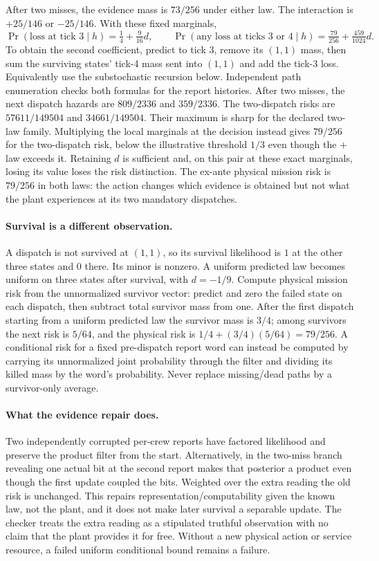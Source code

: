 \documentclass[11pt]{article}
\begin{document}
After two misses, the evidence mass is $73/256$ under either law. The interaction is $+25/146$ or $-25/146$. With these fixed marginals,
\[
\Pr(\text{loss at tick 3}\mid h)=\tfrac14+\tfrac9{16}d,\qquad
\Pr(\text{any loss at ticks 3 or 4}\mid h)=\tfrac{79}{256}+\tfrac{459}{1024}d .
\]
To obtain the second coefficient, predict to tick 3, remove its $(1,1)$ mass, then sum the surviving states' tick-4 mass sent into $(1,1)$ and add the tick-3 loss. Equivalently use the substochastic recursion below. Independent path enumeration checks both formulas for the report histories. After two misses, the next dispatch hazards are $809/2336$ and $359/2336$. The two-dispatch risks are $57611/149504$ and $34661/149504$. Their maximum is sharp for the declared two-law family. Multiplying the local marginals at the decision instead gives $79/256$ for the two-dispatch risk, below the illustrative threshold $1/3$ even though the $+$ law exceeds it. Retaining $d$ is sufficient and, on this pair at these exact marginals, losing its value loses the risk distinction. The ex-ante physical mission risk is $79/256$ in both laws: the action changes which evidence is obtained but not what the plant experiences at its two mandatory dispatches.

\paragraph{Survival is a different observation.}
A dispatch is not survived at $(1,1)$, so its survival likelihood is $1$ at the other three states and $0$ there. Its minor is nonzero. A uniform predicted law becomes uniform on three states after survival, with $d=-1/9$. Compute physical mission risk from the unnormalized survivor vector: predict and zero the failed state on each dispatch, then subtract total survivor mass from one. After the first dispatch starting from a uniform predicted law the survivor mass is $3/4$; among survivors the next risk is $5/64$, and the physical risk is $1/4+(3/4)(5/64)=79/256$. A conditional risk for a fixed pre-dispatch report word can instead be computed by carrying its unnormalized joint probability through the filter and dividing its killed mass by the word's probability. Never replace missing/dead paths by a survivor-only average.

\paragraph{What the evidence repair does.}
Two independently corrupted per-crew reports have factored likelihood and preserve the product filter from the start. Alternatively, in the two-miss branch revealing one actual bit at the second report makes that posterior a product even though the first update coupled the bits. Weighted over the extra reading the old risk is unchanged. This repairs representation/computability given the known law, not the plant, and it does not make later survival a separable update. The checker treats the extra reading as a stipulated truthful observation with no claim that the plant provides it for free. Without a new physical action or service resource, a failed uniform conditional bound remains a failure.
\end{document}
